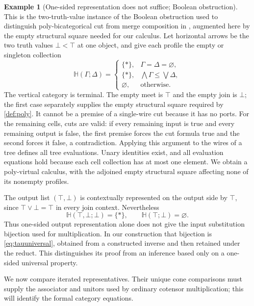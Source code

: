 \documentclass[11pt,reqno]{amsart}
\theoremstyle{plain}
\theoremstyle{definition}
\newtheorem{example}[theorem]{Example}
\theoremstyle{remark}
\numberwithin{equation}{section}
\begin{document}
\begin{example}[One-sided representation does not suffice; Boolean obstruction]\label{ex:boolean}
This is the two-truth-value instance of the Boolean obstruction used to
distinguish poly-bicategorical cut from merge composition in
\cite[Section 5]{Hadzihasanovic2019}, augmented here by the empty structural
square needed for our calculus. Let horizontal arrows be the two truth
values $\bot<\top$ at one object, and give each profile the empty or
singleton collection
\[
 \mathbb H(\Gamma;\Delta)=
 \begin{cases}
  \{*\},&\Gamma=\Delta=\varnothing,\\
  \{*\},&\bigwedge\Gamma\leq\bigvee\Delta,\\
  \varnothing,&\text{otherwise}.
 \end{cases}
\]
The vertical category is terminal. The empty meet is $\top$ and the
empty join is $\bot$; the first case separately supplies the empty
structural square required by \cref{def:poly}. It cannot be a premise
of a single-wire cut because it has no ports. For the remaining cells,
cuts are valid: if every remaining input is true and every remaining
output is false, the first premise forces the cut formula true and the
second forces it false, a contradiction. Applying this argument to the
wires of a tree defines all tree evaluations. Unary identities exist,
and all evaluation equations hold because each cell collection has at
most one element. We obtain a poly-virtual calculus, with the adjoined
empty structural square affecting none of its nonempty profiles.

The output list $(\top,\bot)$ is contextually represented on the
output side by $\top$, since
$\top\vee\bot=\top$ in every join context. Nevertheless
\[
 \mathbb H(\top,\bot;\bot)=\{*\},\qquad
 \mathbb H(\top;\bot)=\varnothing.
\]
Thus one-sided output representation alone does not give the input
substitution bijection used for multiplication. In our construction
that bijection is \cref{eq:tauuniversal}, obtained from a constructed
inverse and then retained under the reduct. This distinguishes its
proof from an inference based only on a one-sided universal property.
\end{example}

We now compare iterated representatives. Their unique cone comparisons
must supply the associator and unitors used by ordinary cotensor
multiplication; this will identify the formal category equations.
\end{document}
